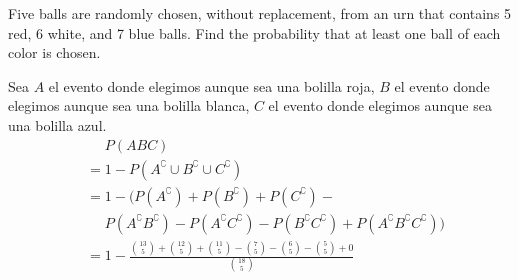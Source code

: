 \item  Five balls are randomly chosen, without replacement, from an urn that contains 5 red, 6 white, and 7 blue balls.
Find the probability that at least one ball of each color is chosen.

Sea $A$ el evento donde elegimos aunque sea una bolilla roja, $B$ el evento donde elegimos aunque sea una bolilla blanca, $C$ el evento donde elegimos aunque sea una bolilla azul.
\begin{align*}
    &\phantom{{}={}} P(ABC)\\
    &= 1 - P(A^\complement \cup B^\complement \cup C^\complement )\\
    &= 1 - \Big( P(A^\complement ) + P(B^\complement ) + P(C^\complement ) - {}\\
    &\phantom{{}={}} P(A^\complement B^\complement ) - P(A^\complement C^\complement ) - P(B^\complement C^\complement ) + P(A^\complement  B^\complement  C^\complement ) \Big )\\
    &= 1 - 
    \frac{\binom{13}{5} + \binom{12}{5} + \binom{11}{5} - \binom{7}{5} - \binom{6}{5} - \binom{5}{5} + 0}{\binom{18}{5}}\\
\end{align*}